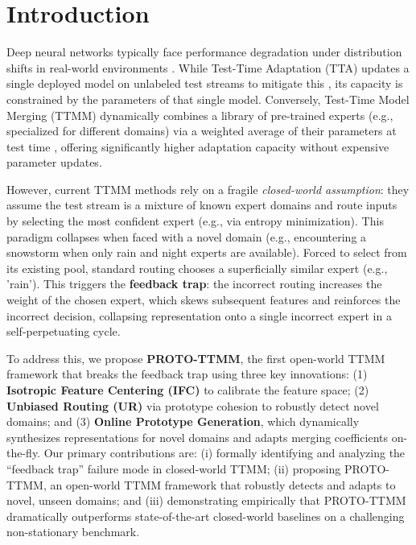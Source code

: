 \documentclass[twoside]{article}
\begin{document}
\section{Introduction}
\label{sec:introduction}

Deep neural networks typically face performance degradation under distribution shifts in real-world environments \cite{lecun2015deep}. While Test-Time Adaptation (TTA) updates a single deployed model on unlabeled test streams to mitigate this \cite{wang2020tent}, its capacity is constrained by the parameters of that single model. Conversely, Test-Time Model Merging (TTMM) dynamically combines a library of pre-trained experts (e.g., specialized for different domains) via a weighted average of their parameters at test time \cite{wortsman2022model}, offering significantly higher adaptation capacity without expensive parameter updates.

However, current TTMM methods rely on a fragile \textit{closed-world assumption}: they assume the test stream is a mixture of known expert domains and route inputs by selecting the most confident expert (e.g., via entropy minimization). This paradigm collapses when faced with a novel domain (e.g., encountering a snowstorm when only rain and night experts are available). Forced to select from its existing pool, standard routing chooses a superficially similar expert (e.g., 'rain'). This triggers the \textbf{feedback trap}: the incorrect routing increases the weight of the chosen expert, which skews subsequent features and reinforces the incorrect decision, collapsing representation onto a single incorrect expert in a self-perpetuating cycle.

To address this, we propose \textbf{PROTO-TTMM}, the first open-world TTMM framework that breaks the feedback trap using three key innovations: (1) \textbf{Isotropic Feature Centering (IFC)} to calibrate the feature space; (2) \textbf{Unbiased Routing (UR)} via prototype cohesion to robustly detect novel domains; and (3) \textbf{Online Prototype Generation}, which dynamically synthesizes representations for novel domains and adapts merging coefficients on-the-fly. Our primary contributions are: (i) formally identifying and analyzing the ``feedback trap'' failure mode in closed-world TTMM; (ii) proposing PROTO-TTMM, an open-world TTMM framework that robustly detects and adapts to novel, unseen domains; and (iii) demonstrating empirically that PROTO-TTMM dramatically outperforms state-of-the-art closed-world baselines on a challenging non-stationary benchmark.
\end{document}
